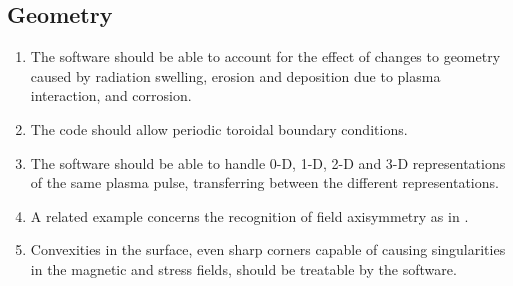 \subsection{Geometry}\label{sec:RB2_geom}
\begin{enumerate}
\item The software should be able to account for the effect of changes to geometry caused by radiation swelling,
erosion and deposition due to plasma interaction, and corrosion.
\item The code should allow periodic toroidal boundary conditions.
\item The software should be able to handle 0-D, 1-D, 2-D and 3-D representations of the same plasma pulse,
transferring between the different representations.
\item A related example concerns the recognition of field axisymmetry as in .
\item Convexities in the surface, even sharp corners capable of causing singularities in the magnetic and stress fields, should
be treatable by the software.
\end{enumerate}
